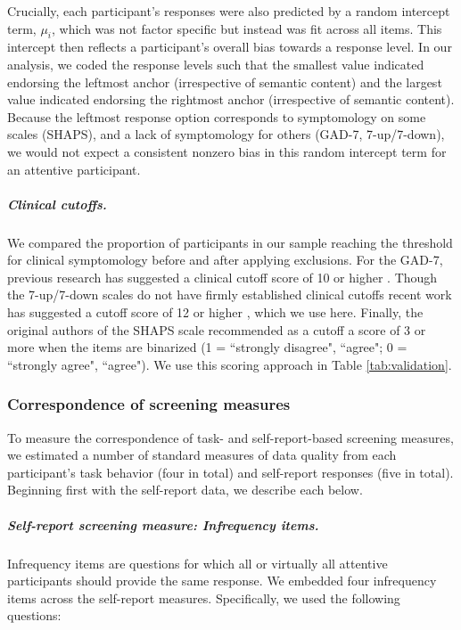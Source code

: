 \documentclass[a4paper,notitlepage,12pt]{article}
\begin{document}
\begin{refsection}[main]
Crucially, each participant's responses were also predicted by a random intercept term, $\mu_i$, which was not factor specific but instead was fit across all items. This intercept then reflects a participant's overall bias towards a response level. In our analysis, we coded the response levels such that the smallest value indicated endorsing the leftmost anchor (irrespective of semantic content) and the largest value indicated endorsing the rightmost anchor (irrespective of semantic content). Because the leftmost response option corresponds to symptomology on some scales (SHAPS), and a lack of symptomology for others (GAD-7, 7-up/7-down), we would not expect a consistent nonzero bias in this random intercept term for an attentive participant. 

\subparagraph{Clinical cutoffs.} We compared the proportion of participants in our sample reaching the threshold for clinical symptomology before and after applying exclusions. For the GAD-7, previous research has suggested a clinical cutoff score of 10 or higher \cite{lowe2008validation, hinz2017psychometric}. Though the 7-up/7-down scales do not have firmly established clinical cutoffs recent work has suggested a cutoff score of 12 or higher \cite{youngstrom2020evaluating}, which we use here. Finally, the original authors of the SHAPS scale recommended as a cutoff a score of 3 or more when the items are binarized (1 = ``strongly disagree", ``agree"; 0 = ``strongly agree", ``agree"). We use this scoring approach in Table \ref{tab:validation}.   

\subsubsection*{Correspondence of screening measures}

To measure the correspondence of task- and self-report-based screening measures, we estimated a number of standard measures of data quality from each participant's task behavior (four in total) and self-report responses (five in total). Beginning first with the self-report data, we describe each below.

\subparagraph{Self-report screening measure: Infrequency items.} Infrequency items are questions for which all or virtually all attentive participants should provide the same response. We embedded four infrequency items across the self-report measures. Specifically, we used the following questions:


\end{refsection}
\end{document}

